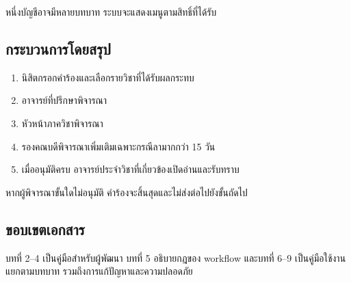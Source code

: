 หนึ่งบัญชีอาจมีหลายบทบาท ระบบจะแสดงเมนูตามสิทธิ์ที่ได้รับ

\subsection{กระบวนการโดยสรุป}
\begin{enumerate}
  \item นิสิตกรอกคำร้องและเลือกรายวิชาที่ได้รับผลกระทบ
  \item อาจารย์ที่ปรึกษาพิจารณา
  \item หัวหน้าภาควิชาพิจารณา
  \item รองคณบดีพิจารณาเพิ่มเติมเฉพาะกรณีลามากกว่า 15 วัน
  \item เมื่ออนุมัติครบ อาจารย์ประจำวิชาที่เกี่ยวข้องเปิดอ่านและรับทราบ
\end{enumerate}
หากผู้พิจารณาขั้นใดไม่อนุมัติ คำร้องจะสิ้นสุดและไม่ส่งต่อไปยังขั้นถัดไป

\subsection{ขอบเขตเอกสาร}
บทที่ 2--4 เป็นคู่มือสำหรับผู้พัฒนา บทที่ 5 อธิบายกฎของ workflow และบทที่ 6--9 เป็นคู่มือใช้งานแยกตามบทบาท รวมถึงการแก้ปัญหาและความปลอดภัย
